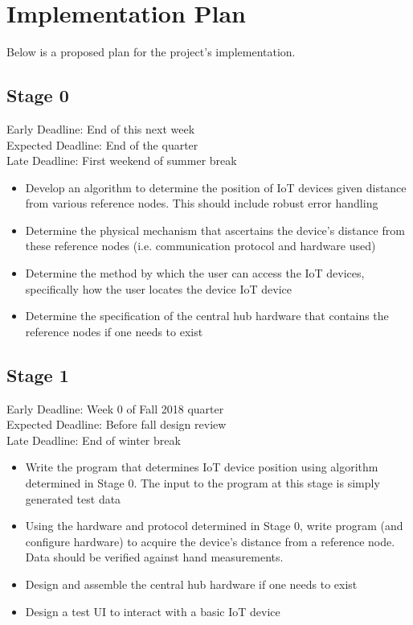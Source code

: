 \documentclass{article}
\begin{document}
\section{Implementation Plan}
Below is a proposed plan for the project's implementation.
\subsection{Stage 0}
Early Deadline: End of this next week \\
Expected Deadline: End of the quarter \\
Late Deadline: First weekend of summer break \\
\begin{itemize}
\item Develop an algorithm to determine the position of IoT devices given distance from various reference nodes. This should include robust error handling
\item Determine the physical mechanism that ascertains the device's distance from these reference nodes (i.e. communication protocol and hardware used)
\item Determine the method by which the user can access the IoT devices, specifically how the user locates the device IoT device
\item Determine the specification of the central hub hardware that contains the reference nodes if one needs to exist
\end{itemize}

\subsection{Stage 1}
Early Deadline: Week 0 of Fall 2018 quarter \\
Expected Deadline: Before fall design review \\
Late Deadline: End of winter break \\
\begin{itemize}
\item Write the program that determines IoT device position using algorithm determined in Stage 0. The input to the program at this stage is simply generated test data
\item Using the hardware and protocol determined in Stage 0, write program (and configure hardware) to acquire the device's distance from a reference node. Data should be verified against hand measurements.
\item Design and assemble the central hub hardware if one needs to exist
\item Design a test UI to interact with a basic IoT device
\end{itemize}
\end{document}
